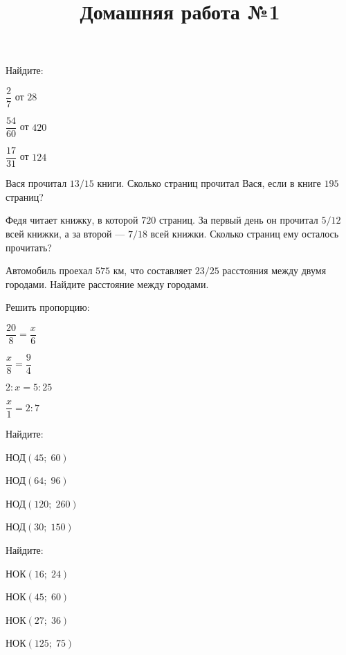 \begin{listofex}
	\item Найдите:
	\begin{enumcols}[itemcolumns=3]
		\item \( \dfrac{2}{7} \) от \( 28 \)
		\item \( \dfrac{54}{60} \) от \( 420 \)
		\item \( \dfrac{17}{31} \) от \( 124 \)
	\end{enumcols}
	\item Вася прочитал \( 13/15 \) книги. Сколько страниц прочитал Вася, если в книге \( 195 \) страниц?
	\item Федя читает книжку, в которой \( 720 \) страниц. За первый день он прочитал \( 5/12 \) всей книжки, а за второй --- \( 7/18 \) всей книжки. Сколько страниц ему осталось прочитать?
	\item Автомобиль проехал \( 575 \) км, что составляет \( 23/25 \) расстояния между двумя городами. Найдите расстояние между городами.
	\item Решить пропорцию:
	\begin{enumcols}[itemcolumns=4]
		\item \( \dfrac{20}{8}=\dfrac{x}{6} \)
		\item \( \dfrac{x}{8}=\dfrac{9}{4} \)
		\item \( 2:x=5:25 \)
		\item \( \dfrac{x}{1}=2:7 \)
	\end{enumcols}
	\item Найдите:
	\begin{enumcols}[itemcolumns=4]
		\item НОД\( (45;\;60) \)
		\item НОД\( (64;\;96) \)
		\item НОД\( (120;\;260) \)
		\item НОД\( (30;\;150) \)
	\end{enumcols}
	\item Найдите:
	\begin{enumcols}[itemcolumns=4]
		\item НОК\( (16;\;24) \)
		\item НОК\( (45;\;60) \)
		\item НОК\( (27;\;36) \)
		\item НОК\( (125;\;75) \)
	\end{enumcols}
\end{listofex}
\newpage
\title{Домашняя работа №1}
